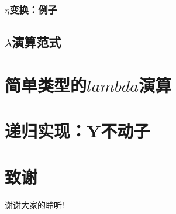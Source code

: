 \documentclass[CJKutf8,compress,hyperref]{beamer}
\begin{document}
\begin{CJK}{UTF8}{song}
\begin{frame}
    \frametitle{$\eta$变换：例子} 
\end{frame} 

\subsection{$\lambda$演算范式}

\section{简单类型的$lambda$演算} 
\section{递归实现：Y不动子} 

\section{致谢}
\begin{frame}
  \begin{Huge}
    \begin{center}
      谢谢大家的聆听!
    \end{center}
  \end{Huge}
\end{frame}
\end{CJK}
\end{document}
